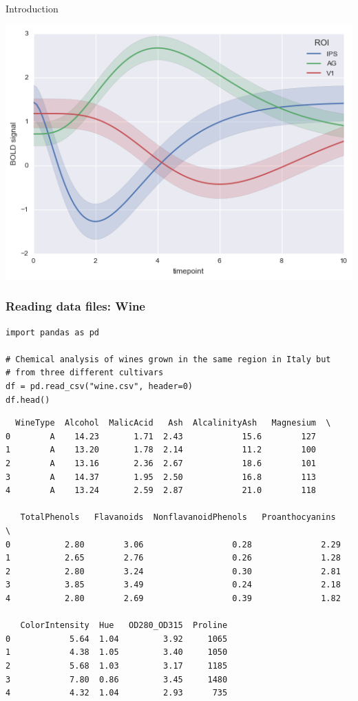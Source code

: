 \documentclass[pdf]{beamer}
\begin{document}
\begin{frame}{Introduction}
\begin{center}
	\includegraphics[width=.3\textwidth]{sdemo6.png}\hfill
\end{center}

\end{frame}

\begin{frame}[fragile]
\frametitle{Reading data files: Wine}

\begin{lstlisting}[style=python]
import pandas as pd

# Chemical analysis of wines grown in the same region in Italy but 
# from three different cultivars
df = pd.read_csv("wine.csv", header=0)
df.head()
\end{lstlisting}

\vspace{-0.8cm}
{\fontsize{5}{6}\selectfont
\begin{verbatim}
  WineType  Alcohol  MalicAcid   Ash  AlcalinityAsh   Magnesium  \
0        A    14.23       1.71  2.43            15.6        127   
1        A    13.20       1.78  2.14            11.2        100   
2        A    13.16       2.36  2.67            18.6        101   
3        A    14.37       1.95  2.50            16.8        113   
4        A    13.24       2.59  2.87            21.0        118   

   TotalPhenols   Flavanoids  NonflavanoidPhenols   Proanthocyanins   \
0           2.80        3.06                  0.28              2.29   
1           2.65        2.76                  0.26              1.28   
2           2.80        3.24                  0.30              2.81   
3           3.85        3.49                  0.24              2.18   
4           2.80        2.69                  0.39              1.82   

   ColorIntensity  Hue   OD280_OD315  Proline  
0            5.64  1.04         3.92     1065  
1            4.38  1.05         3.40     1050  
2            5.68  1.03         3.17     1185  
3            7.80  0.86         3.45     1480  
4            4.32  1.04         2.93      735
\end{verbatim}}

\end{frame}
\end{document}
